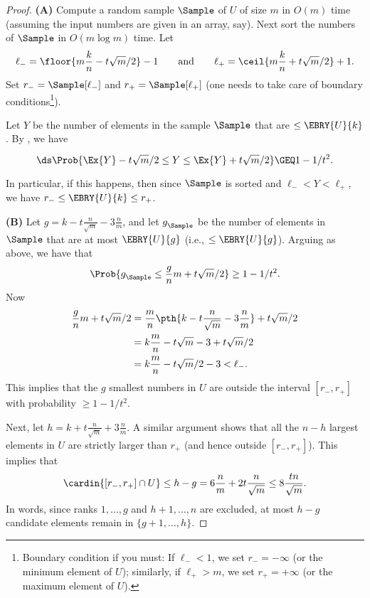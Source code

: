 \begin{proof}
    \textbf{(A)} Compute a random sample $\Sample$ of $U$ of size $m$
    in $O(m)$ time (assuming the input numbers are given in an array,
    say). Next sort the numbers of $\Sample$ in $O( m \log m)$
    time. Let
    \begin{equation*}
        \ell_{-} = \floor{m \frac{k}{n} - t \sqrt{m}/2 }-1
        \qquad \text{and} \qquad%
        \ell_{+} = \ceil{m \frac{k}{n} + t \sqrt{m}/2 }+1.
    \end{equation*}
    Set $r_{-} = \Sample[ \ell_{-}]$ and $r_+ = \Sample[ \ell_{+}]$ (one needs
    to take care of boundary conditions\footnote{Boundary condition if
       you must: If $\ell_- < 1$, we set $r_- = -\infty$ (or the minimum element
       of $U$); similarly, if $\ell_+ > m$, we set $r_+ = +\infty$ (or the
       maximum element of $U$).}).

    Let $Y$ be the number of elements in the sample $\Sample$ that are
    $\leq \EBRY{U}{k}$.  By , we have
    \begin{equation*}
        \ds%
        \Prob{\Bigl. \Ex{Y} - t \sqrt{m}/2 \leq Y \leq \Ex{Y} + t \sqrt{m}/2
        }
        \GEQ
        1- {1}/{t^2}.
    \end{equation*}
    In particular, if this happens, then since $\Sample$ is sorted and
    $\ell_- < Y < \ell_+$, we have $r_- \leq \EBRY{U}{k} \leq r_+$. %

    \bigskip%
    \noindent
    \textbf{(B)} Let $g= k - t \frac{n}{\sqrt{m}} -3\frac{n}{m}$, and let
    $g^{}_\Sample$ be the number of elements in $\Sample$ that are at
    most $\EBRY{U}{g}$ (i.e., $\leq \EBRY{U}{g}$). Arguing as above, we
    have that
    \begin{equation*}
        \Prob{ g^{}_\Sample \leq \frac{g}{n} m + t \sqrt{m}/2 } \geq
        1- {1}/{t^2}.
    \end{equation*}
    Now
    \begin{align*}
      \frac{g}{n} m + t \sqrt{m}/2 %
      &=
      \frac{m}{n}\pth{
      k - t \frac{n}{\sqrt{m}} -3\frac{n}{m} }  +  t \sqrt{m}/2
      \\&=
      k \frac{m}{n} - t \sqrt{m}  -3 +  t \sqrt{m}/2
      \\&=
      k \frac{m}{n} - t \sqrt{m}/2  -3
      < \ell_{-}.
    \end{align*}
    This implies that the $g$ smallest numbers in $U$ are outside the
    interval $[r_-,r_+]$ with probability $\geq 1-1/t^2$.

    Next, let $h= k + t \frac{n}{\sqrt{m}} +3\frac{n}{m}$. A similar
    argument shows that all the $n-h$ largest elements in $U$ are
    strictly larger than $r_+$ (and hence outside $[r_-, r_+]$).  This
    implies that
    \begin{equation*}
      \cardin{[r_-, r_+] \cap U} \leq h-g = 6 \frac{n}{m} + 2t
      \frac{n}{\sqrt{m}}%
      \leq%
      8 \frac{tn}{\sqrt{m}}.
  \end{equation*}
  In words, since ranks $1,\dots,g$ and $h+1,\dots,n$ are excluded, at
  most $h-g$ candidate elements remain in $\{g+1,\dots,h\}$.
\end{proof}


